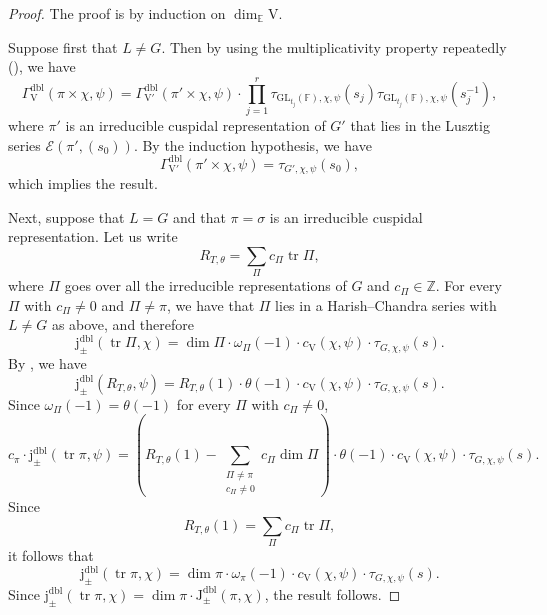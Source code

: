 \documentclass[12pt, reqno]{amsart}
\theoremstyle{definition}
\theoremstyle{definition}
\theoremstyle{definition}
\newcommand{\zIntegers}{\mathbb{Z}}
\newcommand{\hermitianSpace}{\mathrm{V}}
\newcommand{\fieldCharacter}{\psi}
\newcommand{\centralCharacter}[1]{\omega_{#1}}
\newcommand{\trace}{\operatorname{tr}}
\newcommand{\GL}{\mathrm{GL}}
\newcommand{\finiteField}{\mathbb{F}}
\newcommand{\quadraticExtension}{\mathbb{E}}
\newcommand{\dblJacobiSumScalar}[2]{\mathrm{J}_{\pm}^{\mathrm{dbl}}\left(#1, #2\right)}
\newcommand{\dblVirtualJacobiSumScalar}[2]{\mathrm{j}_{\pm}^{\mathrm{dbl}}\left(#1, #2\right)}
\newcommand{\dblGammaFactorSpace}[4]{\Gamma^{\mathrm{dbl}}_{#1}\left(#2 \times #3, #4\right)}
\newcommand{\LusztigSeries}[2]{\mathcal{E}\left(#1, (#2)\right)}
\begin{document}
\begin{proof}
	The proof is by induction on $\dim_{\quadraticExtension} \hermitianSpace$.
	
	Suppose first that $L \ne G$. Then by using the multiplicativity property repeatedly (), we have $$\dblGammaFactorSpace{\hermitianSpace}{\pi}{\chi}{\fieldCharacter} = \dblGammaFactorSpace{\hermitianSpace'}{\pi'}{\chi}{\fieldCharacter} \cdot \prod_{j=1}^r \tau_{\GL_{t_j}\left(\finiteField\right), \chi, \fieldCharacter}\left(s_j\right) \tau_{\GL_{t_j}\left(\finiteField\right), \chi, \fieldCharacter}\left(s_j^{-1}\right),$$
	where $\pi'$ is an irreducible cuspidal representation of $G'$ that lies in the Lusztig series $\LusztigSeries{\pi'}{s_0}$. By the induction hypothesis, we have $$\dblGammaFactorSpace{\hermitianSpace'}{\pi'}{\chi}{\fieldCharacter} = \tau_{G', \chi, \fieldCharacter}\left(s_0\right),$$
	which implies the result.
	
	Next, suppose that $L = G$ and that $\pi = \sigma$ is an irreducible cuspidal representation. Let us write $$R_{T, \theta} = \sum_{\Pi} c_\Pi \trace \Pi,$$
	where $\Pi$ goes over all the irreducible representations of $G$ and $c_{\Pi} \in \zIntegers$. For every $\Pi$ with $c_{\Pi} \ne 0$ and $\Pi \ne \pi$, we have that $\Pi$ lies in a Harish--Chandra series with $L \ne G$ as above, and therefore $$\dblVirtualJacobiSumScalar{\trace \Pi}{\chi} = \dim \Pi \cdot \centralCharacter{\Pi}\left(-1\right) \cdot c_{\hermitianSpace}\left(\chi, \fieldCharacter\right) \cdot \tau_{G, \chi, \fieldCharacter}\left(s\right).$$
	By , we have $$\dblVirtualJacobiSumScalar{R_{T,\theta}}{\fieldCharacter} = R_{T,\theta}\left(1\right) \cdot \theta\left(-1\right) \cdot c_{\hermitianSpace}\left(\chi, \fieldCharacter\right) \cdot \tau_{G, \chi, \fieldCharacter}\left(s\right).$$
	Since $\centralCharacter{\Pi}\left(-1\right) = \theta\left(-1\right)$ for every $\Pi$ with $c_{\Pi} \ne 0$,
	$$c_{\pi} \cdot \dblVirtualJacobiSumScalar{\trace \pi}{\fieldCharacter} = \left(R_{T,\theta}\left(1\right) - \sum_{\substack{\Pi \ne \pi\\
	c_{\Pi} \ne 0}} c_{\Pi} \dim \Pi\right) \cdot \theta\left(-1\right) \cdot c_{\hermitianSpace}\left(\chi, \fieldCharacter\right) \cdot \tau_{G, \chi, \fieldCharacter}\left(s\right).$$
	Since $$R_{T,\theta}\left(1\right) = \sum_{\Pi} c_{\Pi} \trace \Pi,$$ it follows that $$\dblVirtualJacobiSumScalar{\trace \pi}{\chi} = \dim \pi \cdot \centralCharacter{\pi}\left(-1\right) \cdot c_{\hermitianSpace}\left(\chi, \fieldCharacter\right) \cdot \tau_{G, \chi, \fieldCharacter}\left(s\right).$$
	Since $\dblVirtualJacobiSumScalar{\trace \pi}{\chi} = \dim \pi \cdot \dblJacobiSumScalar{\pi}{\chi}$, the result follows.
\end{proof}
\end{document}

